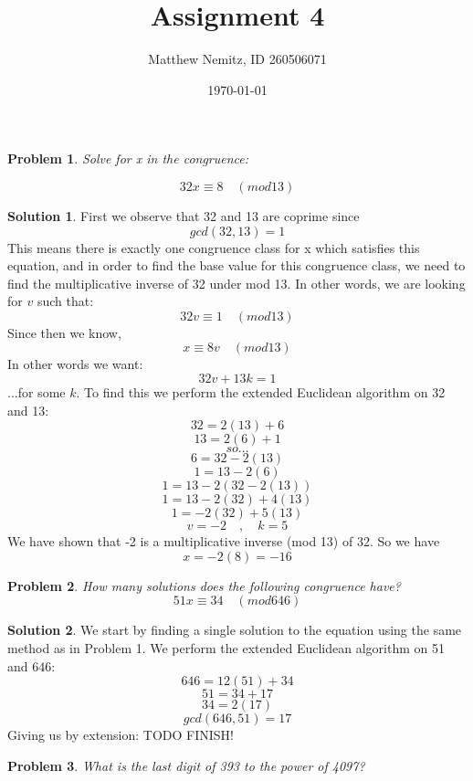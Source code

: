 \documentclass{article}
\newtheorem{problem}{Problem}
\theoremstyle{definition}
\newtheorem*{solution}{Solution}
\begin{document}
 \title{Assignment 4} 

\author{Matthew Nemitz, ID 260506071} 

\date{\today}

\maketitle

\begin{problem} 

Solve for x in the congruence:

\[ 32x \equiv 8 \quad (mod 13)\] 

\end{problem}

\begin{solution}
First we observe that 32 and 13 are coprime since \[gcd(32,13)=1\] This means there is exactly one congruence class for x which satisfies this equation, and in order to find the base value for this congruence class, we need to find the multiplicative inverse of 32 under mod 13. In other words, we are looking for $v$ such that: \[32v \equiv 1 \quad (mod 13)\] Since then we know,\[x \equiv 8v \quad(mod 13)\] In other words we want: \[32v + 13k = 1\] ...for some $k$.
To find this we perform the extended Euclidean algorithm on 32 and 13:
\[32=2(13) + 6\]\[13=2(6)+1\]\[so...\]\[6=32-2(13)\]\[1=13-2(6)\]\[1=13-2(32-2(13))\]\[1=13-2(32)+4(13)\]\[1=-2(32)+5(13)\]\[v=-2 \quad , \quad k=5\]
We have shown that -2 is a multiplicative inverse (mod 13) of 32. So we have \[x = -2(8) = -16\]
\end{solution}
\begin{problem}
How many solutions does the following congruence have?
\[51x \equiv 34 \quad (mod 646)\]
\end{problem}
\begin{solution}
We start by finding a single solution to the equation using the same method as in Problem 1. We perform the extended Euclidean algorithm on 51 and 646:
\[646=12(51) + 34\]\[51 = 34 + 17\]\[34 = 2(17)\]\[gcd(646,51) = 17\]
Giving us by extension: TODO FINISH!
\[\]
\end{solution}
\begin{problem}
	What is the last digit of 393 to the power of 4097?
\end{problem}
\end{document}
